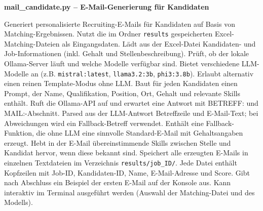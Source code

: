 
\textbf{mail\_candidate.py -- E-Mail-Generierung für Kandidaten}

Generiert personalisierte Recruiting-E-Mails für Kandidaten auf Basis von Matching-Ergebnissen.
Nutzt die im Ordner \texttt{results} gespeicherten Excel-Matching-Dateien als Eingangsdaten.
Lädt aus der Excel-Datei Kandidaten- und Job-Informationen (inkl. Gehalt und Stellenbeschreibung).
Prüft, ob der lokale Ollama-Server läuft und welche Modelle verfügbar sind.
Bietet verschiedene LLM-Modelle an (z.B. \texttt{mistral:latest}, \texttt{llama3.2:3b}, \texttt{phi3:3.8b}).
Erlaubt alternativ einen reinen Template-Modus ohne LLM.
Baut für jeden Kandidaten einen Prompt, der Name, Qualifikation, Position, Ort, Gehalt und relevante Skills enthält.
Ruft die Ollama-API auf und erwartet eine Antwort mit \glqq BETREFF:\grqq{} und \glqq MAIL:\grqq{}-Abschnitt.
Parsed aus der LLM-Antwort Betreffzeile und E-Mail-Text; bei Abweichungen wird ein Fallback-Betreff verwendet.
Enthält eine Fallback-Funktion, die ohne LLM eine sinnvolle Standard-E-Mail mit Gehaltsangaben erzeugt.
Hebt in der E-Mail übereinstimmende Skills zwischen Stelle und Kandidat hervor, wenn diese bekannt sind.
Speichert alle erzeugten E-Mails in einzelnen Textdateien im Verzeichnis \texttt{results/job\_ID/}.
Jede Datei enthält Kopfzeilen mit Job-ID, Kandidaten-ID, Name, E-Mail-Adresse und Score.
Gibt nach Abschluss ein Beispiel der ersten E-Mail auf der Konsole aus.
Kann interaktiv im Terminal ausgeführt werden (Auswahl der Matching-Datei und des Modells).

